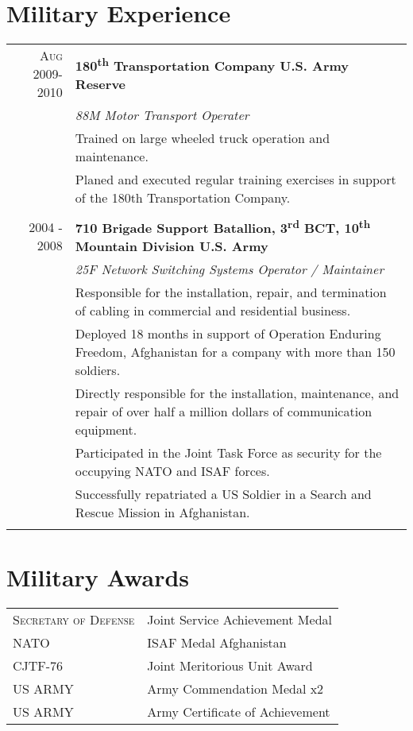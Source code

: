 \documentclass[a4paper,10pt]{article}
\begin{document}
\section{Military Experience}
\begin{tabular}{r|p{15.5cm}}
 \textsc{Aug 2009-2010} & \textbf{180\textsuperscript{th} Transportation Company \hfill U.S. Army Reserve } \\&\emph{88M Motor Transport Operater}\\&\small{Trained on large wheeled truck operation and maintenance.}
 \\&\small{Planed and executed regular training exercises in support of the 180th Transportation Company.}
 \\\multicolumn{2}{c}{} \\

\textsc{2004 - 2008} & \textbf{710 Brigade Support Batallion, 3\textsuperscript{rd} BCT, 10\textsuperscript{th} Mountain Division \hfill U.S. Army }\\&\emph{25F Network Switching Systems Operator / Maintainer} \\&\small{ Responsible for the installation, repair, and termination of cabling in commercial and residential business.}
\\&\small{Deployed 18 months in support of Operation Enduring Freedom, Afghanistan for a company with more than 150 soldiers.}
\\&\small{Directly responsible for the installation, maintenance, and repair of over half a million dollars of communication equipment.}
\\&\small{Participated in the Joint Task Force as security for the occupying NATO and ISAF forces.}
\\&\small{Successfully repatriated a US Soldier in a Search and Rescue Mission in Afghanistan.}
 \\\multicolumn{2}{c}{} \\
\end{tabular}

\section{Military Awards}
\begin{tabular}{l|p{15.5cm}}
 \textsc{Secretary of Defense} & Joint Service Achievement Medal 
  \\ \textsc{NATO} & ISAF Medal Afghanistan 
  \\ \textsc{CJTF-76} & Joint Meritorious Unit Award 
  \\ \textsc{US ARMY} & Army Commendation Medal x2 
  \\ \textsc{US ARMY} & Army Certificate of Achievement 
\end{tabular} 
\end{document}
